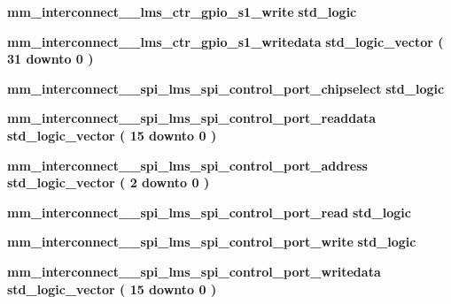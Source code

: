 \begin{DoxyCompactItemize}
\item 
{\bf mm\+\_\+interconnect\+\_\+\_\+lms\+\_\+ctr\+\_\+gpio\+\_\+s1\+\_\+write} {\bfseries \textcolor{comment}{std\+\_\+logic}\textcolor{vhdlchar}{ }} 
\item 
{\bf mm\+\_\+interconnect\+\_\+\_\+lms\+\_\+ctr\+\_\+gpio\+\_\+s1\+\_\+writedata} {\bfseries \textcolor{comment}{std\+\_\+logic\+\_\+vector}\textcolor{vhdlchar}{ }\textcolor{vhdlchar}{(}\textcolor{vhdlchar}{ }\textcolor{vhdlchar}{ } \textcolor{vhdldigit}{31} \textcolor{vhdlchar}{ }\textcolor{keywordflow}{downto}\textcolor{vhdlchar}{ }\textcolor{vhdlchar}{ } \textcolor{vhdldigit}{0} \textcolor{vhdlchar}{ }\textcolor{vhdlchar}{)}\textcolor{vhdlchar}{ }} 
\item 
{\bf mm\+\_\+interconnect\+\_\+\_\+spi\+\_\+lms\+\_\+spi\+\_\+control\+\_\+port\+\_\+chipselect} {\bfseries \textcolor{comment}{std\+\_\+logic}\textcolor{vhdlchar}{ }} 
\item 
{\bf mm\+\_\+interconnect\+\_\+\_\+spi\+\_\+lms\+\_\+spi\+\_\+control\+\_\+port\+\_\+readdata} {\bfseries \textcolor{comment}{std\+\_\+logic\+\_\+vector}\textcolor{vhdlchar}{ }\textcolor{vhdlchar}{(}\textcolor{vhdlchar}{ }\textcolor{vhdlchar}{ } \textcolor{vhdldigit}{15} \textcolor{vhdlchar}{ }\textcolor{keywordflow}{downto}\textcolor{vhdlchar}{ }\textcolor{vhdlchar}{ } \textcolor{vhdldigit}{0} \textcolor{vhdlchar}{ }\textcolor{vhdlchar}{)}\textcolor{vhdlchar}{ }} 
\item 
{\bf mm\+\_\+interconnect\+\_\+\_\+spi\+\_\+lms\+\_\+spi\+\_\+control\+\_\+port\+\_\+address} {\bfseries \textcolor{comment}{std\+\_\+logic\+\_\+vector}\textcolor{vhdlchar}{ }\textcolor{vhdlchar}{(}\textcolor{vhdlchar}{ }\textcolor{vhdlchar}{ } \textcolor{vhdldigit}{2} \textcolor{vhdlchar}{ }\textcolor{keywordflow}{downto}\textcolor{vhdlchar}{ }\textcolor{vhdlchar}{ } \textcolor{vhdldigit}{0} \textcolor{vhdlchar}{ }\textcolor{vhdlchar}{)}\textcolor{vhdlchar}{ }} 
\item 
{\bf mm\+\_\+interconnect\+\_\+\_\+spi\+\_\+lms\+\_\+spi\+\_\+control\+\_\+port\+\_\+read} {\bfseries \textcolor{comment}{std\+\_\+logic}\textcolor{vhdlchar}{ }} 
\item 
{\bf mm\+\_\+interconnect\+\_\+\_\+spi\+\_\+lms\+\_\+spi\+\_\+control\+\_\+port\+\_\+write} {\bfseries \textcolor{comment}{std\+\_\+logic}\textcolor{vhdlchar}{ }} 
\item 
{\bf mm\+\_\+interconnect\+\_\+\_\+spi\+\_\+lms\+\_\+spi\+\_\+control\+\_\+port\+\_\+writedata} {\bfseries \textcolor{comment}{std\+\_\+logic\+\_\+vector}\textcolor{vhdlchar}{ }\textcolor{vhdlchar}{(}\textcolor{vhdlchar}{ }\textcolor{vhdlchar}{ } \textcolor{vhdldigit}{15} \textcolor{vhdlchar}{ }\textcolor{keywordflow}{downto}\textcolor{vhdlchar}{ }\textcolor{vhdlchar}{ } \textcolor{vhdldigit}{0} \textcolor{vhdlchar}{ }\textcolor{vhdlchar}{)}\textcolor{vhdlchar}{ }} 

\end{DoxyCompactItemize}
